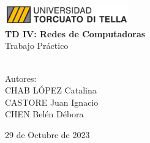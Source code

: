 \documentclass{article}
\begin{document}
    \begin{titlepage}
        \centering
        \vspace*{0.5cm}
        \vspace{1cm}
        \includegraphics[width=0.4\textwidth]{utdt-logo.jpg} \\
        \vspace{1cm}
        \Large{\bfseries{TD IV: Redes de Computadoras}}\\
        \vspace{0.8cm}
        \Large{Trabajo Práctico}\\
        \vspace{0.5cm}
         \\
        \vspace{6cm}
        
        \Large{Autores:}\\
        \vspace{0.5cm}
        \Large{CHAB LÓPEZ Catalina}\\
        \vspace{0.2cm}
        \Large{CASTORE Juan Ignacio}\\
        \vspace{0.2cm}
        \Large{CHEN Belén Débora}\\
        
        \vfill
        
        \large{29 de Octubre de 2023}
    \end{titlepage} 
\end{document}
